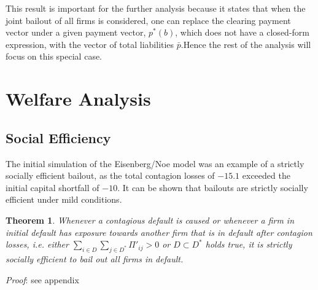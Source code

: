 \documentclass[12pt,a4paper]{article}
\newtheorem{theorem}{Theorem}
\begin{document}
This result is important for the further analysis because it states that when the joint bailout of all firms is considered, one can replace the clearing payment vector under a given payment vector, $p^* (b)$, which does not have a closed-form expression, with the vector of total liabilities $\bar{p}$.Hence the rest of the analysis will focus on this special case.





\section{Welfare Analysis}
\label{sec:welfare}
\subsection{Social Efficiency}
The initial simulation of the Eisenberg/Noe model was an example of a strictly socially efficient bailout, as the total contagion losses of $-15.1$ exceeded the initial capital shortfall of $-10$. It can be shown that bailouts are strictly socially efficient under mild conditions. 

\begin{theorem}\label{the:socefficiency}
Whenever a contagious default is caused or whenever a firm in initial default has exposure towards another firm that is in default after contagion losses, i.e. either $\sum_{i \in D} \sum_{j \in D^*} \Pi'_{ij} >0$ or $D \subset D^*$ holds true, it is strictly socially efficient to bail out all firms in default.
\end{theorem}
\textit{Proof}: see appendix
\end{document}
